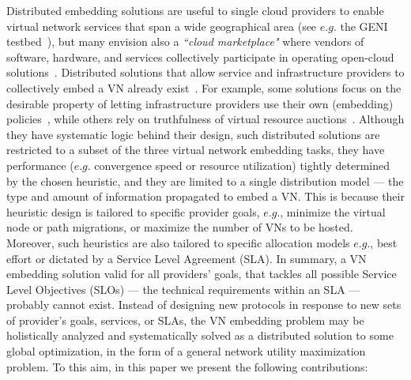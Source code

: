 \documentclass[a4paper, 10pt, conference]{ieeeconf}
\begin{document}
Distributed embedding solutions are useful to single cloud providers to enable virtual network services that span a wide geographical area (see $e.g.$ the GENI testbed~\cite{GENI}), but many envision also a {\it ``cloud marketplace"} where vendors of software, hardware, and services collectively participate in operating open-cloud solutions~\cite{azer-ocx}. 
Distributed solutions that allow service and infrastructure providers to collectively embed a VN already exist~\cite{Houidi-distributedVNM,V-Mart,Polyvine}. For example, some solutions focus on the desirable property of letting infrastructure providers use their own (embedding) policies~\cite{Polyvine}, while others rely on truthfulness of virtual resource auctions~\cite{V-Mart}.  
Although they have systematic logic behind their design, such distributed solutions are restricted to a subset of the three virtual network embedding tasks, they have performance ($e.g.$ convergence speed or resource utilization) tightly determined by the chosen heuristic, and they are limited to a single distribution model --- the type and amount of information propagated to embed a VN. 
This is because their heuristic design is tailored to specific provider goals, $e.g.$, minimize the virtual node or path migrations, or maximize the number of VNs to be hosted. Moreover, such heuristics are also tailored to specific allocation models $e.g.$, best effort or dictated by a Service Level Agreement (SLA). 
In summary, a VN embedding solution valid for all providers' goals, that tackles all possible Service Level Objectives (SLOs) --- the technical requirements within an SLA --- probably cannot exist. 
Instead of designing new protocols in response to new sets of provider's goals, services, or SLAs, the VN embedding problem may be holistically analyzed and systematically solved as a distributed solution to some global optimization, in the form of a general network utility maximization problem.
To this aim, in this paper we present the following contributions:
\end{document}
